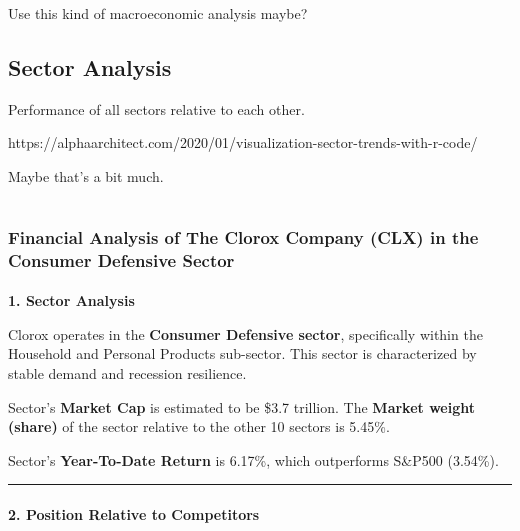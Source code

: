 \documentclass[
  letterpaper,
  DIV=11,
  numbers=noendperiod]{scrartcl}
\makeatletter
\let\oldparagraph\paragraph
\renewcommand{\paragraph}{
    \@ifstar
      \xxxParagraphStar
      \xxxParagraphNoStar
  }
\newcommand{\xxxParagraphStar}[1]{\oldparagraph*{#1}\mbox{}}
\newcommand{\xxxParagraphNoStar}[1]{\oldparagraph{#1}\mbox{}}
\makeatother
\begin{document}
Use this kind of macroeconomic analysis maybe?

\subsection{Sector Analysis}\label{sector-analysis}

Performance of all sectors relative to each other.

https://alphaarchitect.com/2020/01/visualization-sector-trends-with-r-code/

Maybe that's a bit much.

\section{}\label{section-1}

\subsubsection{Financial Analysis of The Clorox Company (CLX) in the
Consumer Defensive
Sector}\label{financial-analysis-of-the-clorox-company-clx-in-the-consumer-defensive-sector}

\paragraph{\texorpdfstring{\textbf{1. Sector
Analysis}}{1. Sector Analysis}}\label{sector-analysis-1}

Clorox operates in the \textbf{Consumer Defensive sector}, specifically
within the Household and Personal Products sub-sector. This sector is
characterized by stable demand and recession resilience.

Sector's \textbf{Market Cap} is estimated to be \$3.7 trillion. The
\textbf{Market weight (share)} of the sector relative to the other 10
sectors is 5.45\%.

Sector's \textbf{Year-To-Date Return} is 6.17\%, which outperforms
S\&P500 (3.54\%).

\begin{center}\rule{0.5\linewidth}{0.5pt}\end{center}

\paragraph{\texorpdfstring{\textbf{2. Position Relative to
Competitors}}{2. Position Relative to Competitors}}\label{position-relative-to-competitors}
\end{document}
